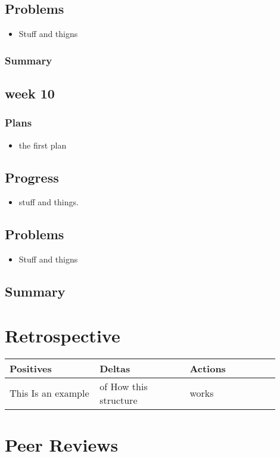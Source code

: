 \documentclass[onecolumn, draftclsnofoot,10pt, compsoc]{article}
\begin{document}
			\subsection{Problems}
				\begin{itemize}
					\item Stuff and thigns
				\end{itemize}
			\subsubsection{Summary}

		\subsection{week 10}
			\subsubsection{Plans}
				\begin{itemize}
					\item the first plan
				\end{itemize}
			\subsection{Progress}
				\begin{itemize}
					\item stuff and things.
				\end{itemize}
			\subsection{Problems}
				\begin{itemize}
					\item Stuff and thigns
				\end{itemize}
			\subsection{Summary}
		

\section{Retrospective}
	\begin{center}
		\begin{tabular}{| p{0.3\linewidth} | p{0.3\linewidth} | p{0.3\linewidth} |}
		\hline
		Positives & Deltas & Actions \\ \hline
		This Is an example & of How this structure & works \\ \hline
	\end{tabular}
\end{center}
	
	
\section{Peer Reviews}
\end{document}
